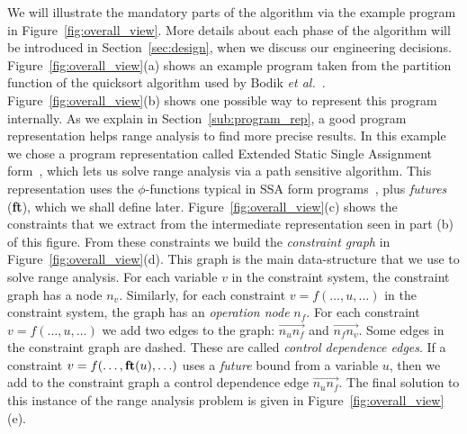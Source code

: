 \documentclass{llncs}
\newcommand{\fun}[1]{\mbox{\textbf{#1}}}
\begin{document}
We will illustrate the mandatory parts of the
algorithm via the example program in Figure~\ref{fig:overall_view}.
More details about each phase of the algorithm will be introduced in
Section~\ref{sec:design}, when we discuss our engineering decisions.
Figure~\ref{fig:overall_view}(a) shows an example program taken from the
partition function of the quicksort algorithm used by Bodik
{\em et al.}~\cite{Bodik00}.
Figure~\ref{fig:overall_view}(b) shows one possible way to represent this
program internally.
As we explain in Section~\ref{sub:program_rep}, a good program
representation helps range analysis to find more precise results.
In this example we chose a program representation called
Extended Static Single Assignment form~\cite{Bodik00}, which lets us solve range
analysis via a path sensitive algorithm.
This representation uses the $\phi$-functions typical in SSA form
programs~\cite{Cytron91}, plus {\em futures} (\textbf{ft}), which we shall
define later.
Figure~\ref{fig:overall_view}(c) shows the constraints that we extract from
the intermediate representation seen in part (b) of this figure.
From these constraints we build the {\em constraint graph} in
Figure~\ref{fig:overall_view}(d).
This graph is the main data-structure that we use to solve range analysis.
For each variable $v$ in the constraint system, the constraint graph has a node
$n_v$.
Similarly, for each constraint $v = f(\ldots, u, \ldots)$ in the constraint
system, the graph has an {\em operation node} $n_f$.
For each constraint $v = f(\ldots, u, \ldots)$ we add two edges to the
graph: $\overrightarrow{n_un_f}$ and $\overrightarrow{n_fn_v}$.
Some edges in the constraint graph are dashed.
These are called {\em control dependence edges}.
If a constraint $v = f(\ldots, \fun{ft}(u), \ldots)$ uses a {\em future}
bound from a variable $u$, then we add to the constraint graph a control
dependence edge $\overrightarrow{n_un_f}$.
The final solution to this instance of the range analysis problem is
given in Figure~\ref{fig:overall_view}(e).
\end{document}

